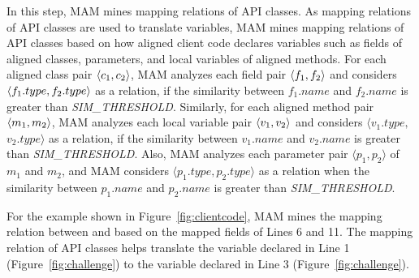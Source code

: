 In this step, MAM mines mapping relations of
API classes. As mapping relations of API classes are used
to translate variables, MAM mines mapping
relations of API classes based on how aligned client code declares
variables such as fields of aligned classes, parameters, and local variables of aligned methods. For each aligned class pair $\langle c_1, c_2 \rangle$, MAM analyzes each field pair $\langle f_1, f_2 \rangle$ and considers
$\langle f_1.type, f_2.type \rangle$ as a relation, if the similarity between $f_1.name$ and $f_2.name$ is
greater than \emph{SIM\_THRESHOLD}. Similarly, for each aligned method pair
$\langle m_1, m_2 \rangle$, MAM analyzes each local variable pair
$\langle v_1, v_2 \rangle$ and considers $\langle v_1.type,$ $
v_2.type\rangle$ as a relation, if the similarity between
$v_1.name$ and $v_2.name$ is greater than
\emph{SIM\_THRESHOLD}. Also, MAM analyzes each parameter pair
$\langle p_1, p_2\rangle$ of $m_1$ and $m_2$, and MAM considers $\langle p_1.type, p_2.type\rangle$ as
a relation when the similarity between $p_1.name$ and $p_2.name$ is greater than \emph{SIM\_THRESHOLD}.

For the example shown in Figure~\ref{fig:clientcode}, MAM
mines the mapping relation between  and
 based on the mapped fields of Lines 6
and 11. The mapping relation of API
classes helps translate the variable declared in Line 1
(Figure~\ref{fig:challenge}) to the variable declared in Line 3
(Figure~\ref{fig:challenge}).



